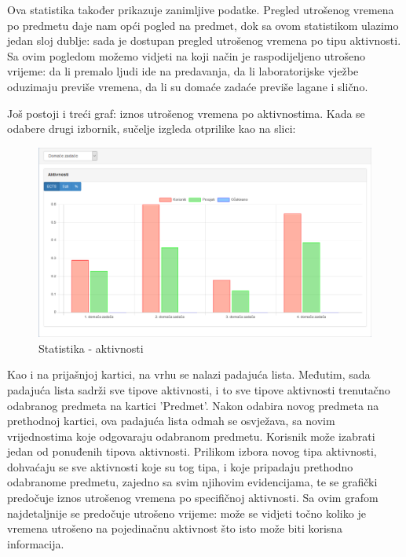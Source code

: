 \documentclass[times, utf8, zavrsni]{fer}
\begin{document}
Ova statistika također prikazuje zanimljive podatke. Pregled utrošenog vremena po predmetu daje nam opći pogled na predmet, dok sa ovom statistikom ulazimo jedan sloj dublje: sada je dostupan pregled utrošenog vremena po tipu aktivnosti. Sa ovim pogledom možemo vidjeti na koji način je raspodijeljeno utrošeno vrijeme: da li premalo ljudi ide na predavanja, da li laboratorijske vježbe oduzimaju previše vremena, da li su domaće zadaće previše lagane i slično.

Još postoji i treći graf: iznos utrošenog vremena po aktivnostima. Kada se odabere drugi izbornik, sučelje izgleda otprilike kao na slici:

\begin{figure}[H]
\centering
\includegraphics[width=\textwidth,height=\textheight,keepaspectratio]{img/statistika-aktivnosti.png}
\caption{Statistika - aktivnosti}
\label{fig:statistika-aktivnosti}
\end{figure}

Kao i na prijašnjoj kartici, na vrhu se nalazi padajuća lista. Međutim, sada padajuća lista sadrži sve tipove aktivnosti, i to sve tipove aktivnosti trenutačno odabranog predmeta na kartici 'Predmet'. Nakon odabira novog predmeta na prethodnoj kartici, ova padajuća lista odmah se osvježava, sa novim vrijednostima koje odgovaraju odabranom predmetu. Korisnik može izabrati jedan od ponuđenih tipova aktivnosti. Prilikom izbora novog tipa aktivnosti, dohvaćaju se sve aktivnosti koje su tog tipa, i koje pripadaju prethodno odabranome predmetu, zajedno sa svim njihovim evidencijama, te se grafički predočuje iznos utrošenog vremena po specifičnoj aktivnosti. Sa ovim grafom najdetaljnije se predočuje utrošeno vrijeme: može se vidjeti točno koliko je vremena utrošeno na pojedinačnu aktivnost što isto može biti korisna informacija.
\end{document}
